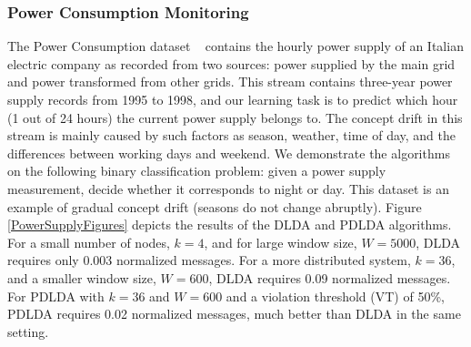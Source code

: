 \subsubsection{Power Consumption Monitoring}
The Power Consumption dataset ~\cite{powerSupply} contains the hourly power supply of an
Italian electric company as recorded from two sources: power supplied
by the main grid and power transformed from other grids.
This stream contains three-year power supply records
from 1995 to 1998, and our learning task is to predict which hour (1 out of 24 hours) the current power supply belongs to. The concept drift in this stream
is mainly caused by such factors as season, weather, time of day,
and the differences between working days and weekend.
We demonstrate the algorithms on the following binary classification problem:
given a power supply measurement, decide whether it corresponds to night or day.
This dataset is an example of gradual concept drift (seasons do not
change abruptly).
Figure \ref{PowerSupplyFigures} depicts the results of the DLDA
and PDLDA algorithms. For a small number of nodes, $k=4$, and for large
window size, $W=5000$, DLDA requires only 0.003 normalized messages.
For a more distributed system, $k=36$, and a smaller window
size, $W=600$, DLDA requires 0.09 normalized messages. For PDLDA with
$k=36$ and $W=600$ and a violation threshold (VT) of 50\%, PDLDA
requires 0.02 normalized messages, much better than DLDA in the same setting.


